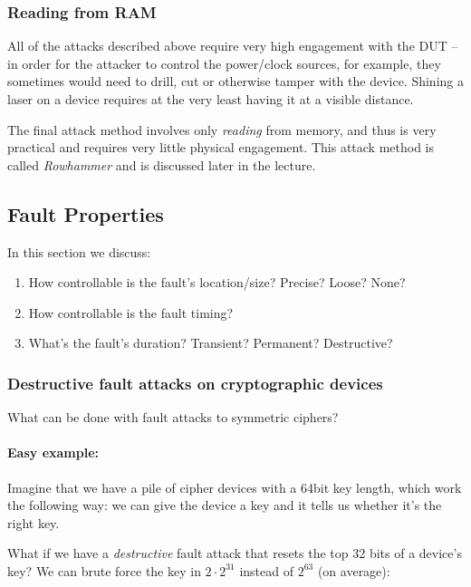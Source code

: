 \subsubsection{Reading from RAM}\label{subsubsec:reading_from_ram}
All of the attacks described above require very high engagement with the DUT --
in order for the attacker to control the power/clock sources, for example, they
sometimes would need to drill, cut or otherwise tamper with the device. Shining
a laser on a device requires at the very least having it at a visible distance.

The final attack method involves only \emph{reading} from memory, and thus is
very practical and requires very little physical engagement. This attack method
is called \emph{Rowhammer} and is discussed later in the lecture.


\subsection{Fault Properties}\label{subsec:fault_properties}
In this section we discuss:
\begin{enumerate}
	\item How controllable is the fault's location/size? Precise? Loose? None?
	\item How controllable is the fault timing?
	\item What's the fault's duration? Transient? Permanent? Destructive?
\end{enumerate}


\subsubsection*{Destructive fault attacks on cryptographic devices}\label{subsubsec:destructive_fault_attacks_on_cryptographic_devices}
What can be done with fault attacks to symmetric ciphers? \paragraph{Easy
example:} Imagine that we have a pile of cipher devices with a 64bit key length,
which work the following way: we can give the device a key and it tells us
whether it's the right key.

What if we have a \emph{destructive} fault attack that resets the top 32 bits of a
device's key? We can brute force the key in \(2\cdot 2^{31}\) instead of
\(2^{63}\) (on average):


